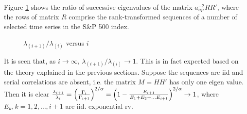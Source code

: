 Figure \ref{fig:EigenRatio} shows the ratio of successive eigenvalues
of the matrix $a_{np}^{-2}RR'$, where the rows of matrix $R$ comprise
the rank-transformed sequences of a number of selected time series
in the S\&P 500 index.
\begin{figure}[htb!]
  \centering
  \caption{$\lambda_{(i+1)} / \lambda_{(i)}$ versus $i$}
  \label{fig:EigenRatio}
\end{figure}
It is seen that, as $i \to \infty$, $\lambda_{(i+1)} / \lambda_{(i)}
\to 1$. This is in fact expected based on the theory explained in the previous sections. Suppose the sequences are iid and serial correlations are absent, i.e. the matrix $M=H H'$ has only one eigen value. Then it is clear ${\lambda_{i+1} \over \lambda_i}=\left({\Gamma_i \over \Gamma_{i+1}}\right)^{2/\alpha}=\left(1 - {E_{i+1} \over E_1 + E_2 + \dots E_{i+1}}\right)^{2/\alpha} \to 1$, where $E_k, k=1,2,\dots,i+1$ are iid. exponential rv.
